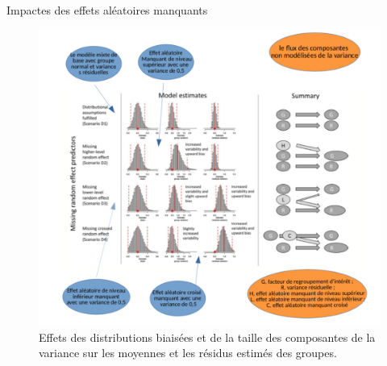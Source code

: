 \documentclass[unknownkeysallowed]{beamer}
\begin{document}
\begin{frame}{Impactes des effets aléatoires manquants }

\begin{figure}
\includegraphics[scale=0.28]{4.png}
\caption{Effets des distributions biaisées et de la taille des composantes de la variance sur les moyennes et les résidus estimés des groupes.}
\end{figure}
\end{frame}
\end{document}
